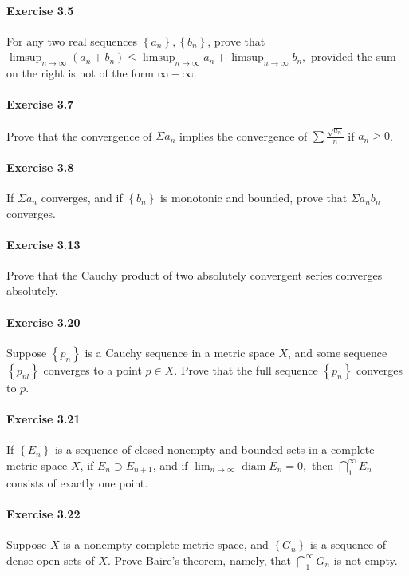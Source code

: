 \documentclass{article}
\begin{document}
\paragraph{Exercise 3.5} For any two real sequences $\left\{a_{n}\right\},\left\{b_{n}\right\}$, prove that $\limsup _{n \rightarrow \infty}\left(a_{n}+b_{n}\right) \leq \limsup _{n \rightarrow \infty} a_{n}+\limsup _{n \rightarrow \infty} b_{n},$ provided the sum on the right is not of the form $\infty-\infty$.

\paragraph{Exercise 3.7} Prove that the convergence of $\Sigma a_{n}$ implies the convergence of $\sum \frac{\sqrt{a_{n}}}{n}$ if $a_n\geq 0$.

\paragraph{Exercise 3.8} If $\Sigma a_{n}$ converges, and if $\left\{b_{n}\right\}$ is monotonic and bounded, prove that $\Sigma a_{n} b_{n}$ converges.

\paragraph{Exercise 3.13} Prove that the Cauchy product of two absolutely convergent series converges absolutely.

\paragraph{Exercise 3.20} Suppose $\left\{p_{n}\right\}$ is a Cauchy sequence in a metric space $X$, and some sequence $\left\{p_{n l}\right\}$ converges to a point $p \in X$. Prove that the full sequence $\left\{p_{n}\right\}$ converges to $p$.

\paragraph{Exercise 3.21} If $\left\{E_{n}\right\}$ is a sequence of closed nonempty and bounded sets in a complete metric space $X$, if $E_{n} \supset E_{n+1}$, and if $\lim _{n \rightarrow \infty} \operatorname{diam} E_{n}=0,$ then $\bigcap_{1}^{\infty} E_{n}$ consists of exactly one point.

\paragraph{Exercise 3.22} Suppose $X$ is a nonempty complete metric space, and $\left\{G_{n}\right\}$ is a sequence of dense open sets of $X$. Prove Baire's theorem, namely, that $\bigcap_{1}^{\infty} G_{n}$ is not empty.
\end{document}
